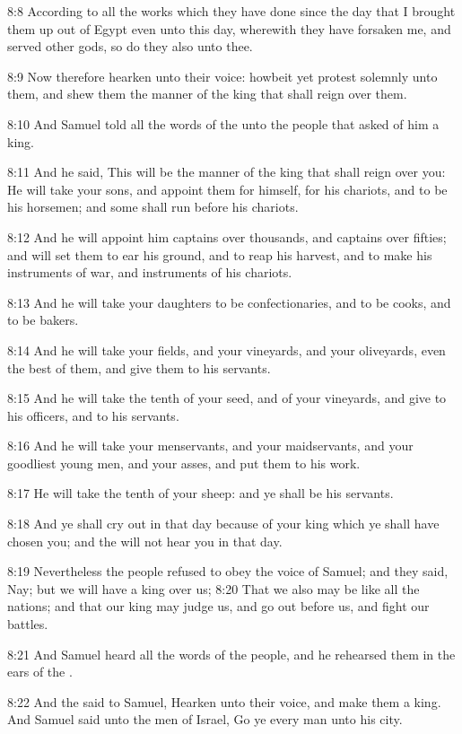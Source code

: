 8:8 According to all the works which they have done since the day that I brought them up out of Egypt even unto this day, wherewith they have forsaken me, and served other gods, so do they also unto thee.

8:9 Now therefore hearken unto their voice: howbeit yet protest solemnly unto them, and shew them the manner of the king that shall reign over them.

8:10 And Samuel told all the words of the \LORD unto the people that asked of him a king.

8:11 And he said, This will be the manner of the king that shall reign over you: He will take your sons, and appoint them for himself, for his chariots, and to be his horsemen; and some shall run before his chariots.

8:12 And he will appoint him captains over thousands, and captains over fifties; and will set them to ear his ground, and to reap his harvest, and to make his instruments of war, and instruments of his chariots.

8:13 And he will take your daughters to be confectionaries, and to be cooks, and to be bakers.

8:14 And he will take your fields, and your vineyards, and your oliveyards, even the best of them, and give them to his servants.

8:15 And he will take the tenth of your seed, and of your vineyards, and give to his officers, and to his servants.

8:16 And he will take your menservants, and your maidservants, and your goodliest young men, and your asses, and put them to his work.

8:17 He will take the tenth of your sheep: and ye shall be his servants.

8:18 And ye shall cry out in that day because of your king which ye shall have chosen you; and the \LORD will not hear you in that day.

8:19 Nevertheless the people refused to obey the voice of Samuel; and they said, Nay; but we will have a king over us; 8:20 That we also may be like all the nations; and that our king may judge us, and go out before us, and fight our battles.

8:21 And Samuel heard all the words of the people, and he rehearsed them in the ears of the \LORD.

8:22 And the \LORD said to Samuel, Hearken unto their voice, and make them a king. And Samuel said unto the men of Israel, Go ye every man unto his city.

